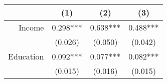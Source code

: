 \begin{tabular}{rccc}
	\toprule
			& (1)	 	&	(2) 		& (3)		\\
	\midrule
Income		& 0.298*** 	& 0.638***	& 0.488*** 	\\
			& (0.026)   & (0.050)   & (0.042)   \\
Education 	&  0.092***	& 0.077***	& 0.082*** 	\\
			& (0.015)   & (0.016)	&  (0.015)  \\
	\bottomrule
\end{tabular}